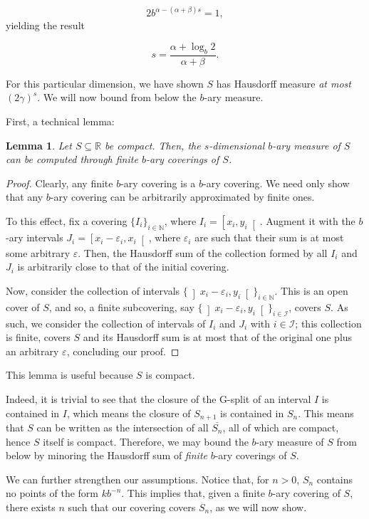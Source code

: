 \documentclass[11pt, reqno]{amsart}
\newcommand{\R}{\mathbb{R}}
\newcommand{\N}{\mathbb{N}}
\newtheorem{lemma}{Lemma}
\begin{document}
\[ 2 b^{\alpha - (\alpha + \beta) s} = 1,\]
yielding the result

\[s = \frac{\alpha + \log_b 2}{\alpha + \beta}.\]

For this particular dimension, we have shown $S$ has Hausdorff measure \emph{at most} $(2 \gamma)^s$. We will now bound from below the $b$-ary measure.

First, a technical lemma:

\begin{lemma}
Let $S \subseteq \R$ be compact. Then, the $s$-dimensional $b$-ary measure of $S$ can be computed through finite $b$-ary coverings of $S$.
\end{lemma}

\begin{proof}
Clearly, any finite $b$-ary covering is a $b$-ary covering. We need only show that any $b$-ary covering can be arbitrarily approximated by finite ones.

To this effect, fix a covering $\{ I_i \}_{i \in \N}$, where $I_i = \left[x_i, y_i \right[$. Augment it with the $b$-ary intervals $J_i = \left[x_i - \varepsilon_i, x_i \right[$, where $\varepsilon_i$ are such that their sum is at most some arbitrary $\varepsilon$. Then, the Hausdorff sum of the collection formed by all $I_i$ and $J_i$ is arbitrarily close to that of the initial covering.

Now, consider the collection of intervals $\{ \left]x_i - \varepsilon_i, y_i \right[ \}_{i \in \N}$. This is an open cover of $S$, and so, a finite subcovering, say $\{ \left]x_i - \varepsilon_i, y_i \right[ \}_{i \in \mathcal{I}}$, covers $S$. As such, we consider the collection of intervals of $I_i$ and $J_i$ with $i \in \mathcal{I}$; this collection is finite, covers $S$ and its Hausdorff sum is at most that of the original one plus an arbitrary $\varepsilon$, concluding our proof.
\end{proof}

This lemma is useful because $S$ is compact.

Indeed, it is trivial to see that the closure of the G-split of an interval $I$ is contained in $I$, which means the closure of $S_{n+1}$ is contained in $S_n$. This means that $S$ can be written as the intersection of all $\overline{S_n}$, all of which are compact, hence $S$ itself is compact. Therefore, we may bound the $b$-ary measure of $S$ from below by minoring the Hausdorff sum of \emph{finite} $b$-ary coverings of $S$.

We can further strengthen our assumptions. Notice that, for $n > 0$, $S_n$ contains no points of the form $k b^{-n}$. This implies that, given a finite $b$-ary covering of $S$, there exists $n$ such that our covering covers $S_n$, as we will now show.
\end{document}
